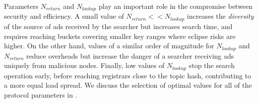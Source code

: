 Parameters $N_\textit{return}$ and $N_\textit{lookup}$ play an important role in the compromise between security and efficiency.
A small value of $N_\textit{return} << N_\textit{lookup}$ increases the \emph{diversity} of the source of ads received by the searcher but increases search time, and requires reaching buckets covering smaller key ranges where eclipse risks are higher.
On the other hand, values of a similar order of magnitude for $N_\textit{lookup}$ and $N_\textit{return}$ reduce overheads but increase the danger of a searcher receiving ads uniquely from malicious nodes.
Finally, low values of $N_\textit{lookup}$ stop the search operation early, before reaching registrars close to the topic hash, contributing to a more equal load spread. 
We discuss the selection of optimal values for all of the protocol parameters in . 






